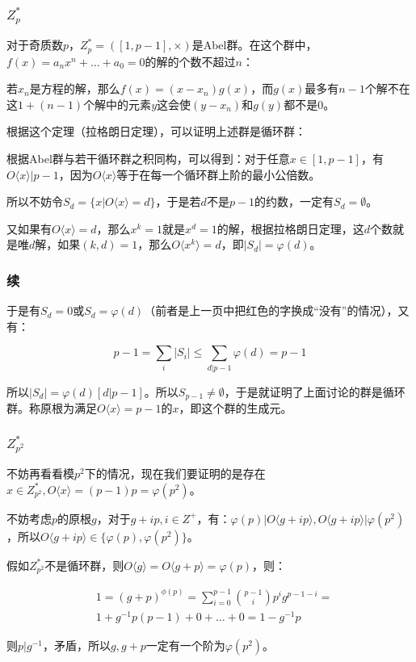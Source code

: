 \documentclass[10pt]{beamer}
\begin{document}
	\begin{frame}
		\frametitle{$Z_p^*$}
	
		对于奇质数$p$，$Z_p^*=([1,p-1],\times)$是Abel群。在这个群中，$f(x)=a_nx^n+\dots+a_0=0$的解的个数不超过$n$：

		若$x_n$是方程的解，那么$f(x)=(x-x_n)g(x)$，而$g(x)$最多有$n-1$个解不在这$1+(n-1)$个解中的元素$y$这会使$(y-x_n)$和$g(y)$都不是$0$。

		根据这个定理（拉格朗日定理），可以证明上述群是循环群：

		根据Abel群与若干循环群之积同构，可以得到：对于任意$x\in[1,p-1]$，有$O\langle x\rangle|p-1$，因为$O\langle x\rangle$等于在每一个循环群上阶的最小公倍数。

		所以不妨令$S_d=\{x|O\langle x\rangle=d\}$，于是若$d$不是$p-1$的约数，一定有$S_d=\emptyset$。

		又如果{\color{red}有}$O\langle x\rangle=d$，那么$x^{k}=1$就是$x^d=1$的解，根据拉格朗日定理，这$d$个数就是唯$d$解，如果$(k,d)=1$，那么$O\langle x^k\rangle=d$，即$|S_d|=\varphi(d)$。
	
	\end{frame}
	\begin{frame}
		\frametitle{续}
	
		于是有$S_d=0$或$S_d=\varphi(d)$（前者是上一页中把红色的字换成“没有”的情况），又有：

		$$
		p-1=\sum_i |S_i|\le \sum_{d|p-1} \varphi(d)=p-1
		$$

		所以$|S_d|=\varphi(d)[d|p-1]$。所以$S_{p-1}\not=\emptyset$，于是就证明了上面讨论的群是循环群。称原根为满足$O\langle x\rangle=p-1$的$x$，即这个群的生成元。
	
	\end{frame}
	\begin{frame}
		\frametitle{$Z^*_{p^2}$}
	
		不妨再看看模$p^2$下的情况，现在我们要证明的是存在$x\in Z^*_{p^2},O\langle x\rangle=(p-1)p=\varphi(p^2)$。

		不妨考虑$p$的原根$g$，对于$g+ip,i\in Z^+$，有：$\varphi(p)|O\langle g+ip\rangle,O\langle g+ip\rangle|\varphi(p^2)$，所以$O\langle g+ip\rangle\in\{\varphi(p),\varphi(p^2)\}$。

		假如$Z_{p^2}^*$不是循环群，则$O\langle g\rangle=O\langle g+p\rangle=\varphi(p)$，则：

		$$
		\begin{aligned}
			&1=(g+p)^{\phi(p)}=\sum_{i=0}^{p-1}{p-1\choose i}p^{i}g^{p-1-i}=\\
			&1+g^{-1}p(p-1)+0+\dots+0=1-g^{-1}p
		\end{aligned}
		$$

		则$p|g^{-1}$，矛盾，所以$g,g+p$一定有一个阶为$\varphi(p^2)$。
	
	\end{frame}
\end{document}
